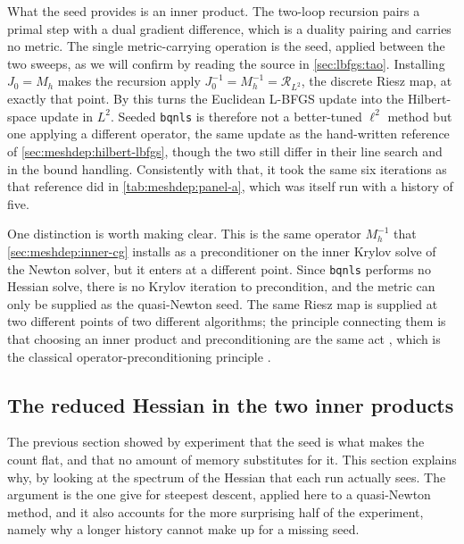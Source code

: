 \documentclass[a4paper,11pt]{article}
\newcommand{\Rmap}{\mathcal{R}}              %
\theoremstyle{spacedplain} \newtheorem{theorem}[counter]{Theorem} \newtheorem{lemma}[counter]{Lemma} \newtheorem{prop}[counter]{Proposition} \newtheorem{cor}[counter]{Corollary}
\theoremstyle{spaceddefinition} \newtheorem{defn}[counter]{Definition} \newtheorem{example}[counter]{Example} \newtheorem{remark}[counter]{Remark}
\begin{document}
What the seed provides is an inner product. The two-loop recursion pairs a primal step with a dual gradient difference, which is a duality pairing and carries no metric. The single metric-carrying operation is the seed, applied between the two sweeps, as we will confirm by reading the source in \cref{sec:lbfgs:tao}. Installing $J_0 = M_h$ makes the recursion apply $J_0^{-1} = M_h^{-1} = \Rmap_{L^{2}}$, the discrete Riesz map, at exactly that point. By \citet[(1.208)--(1.210)]{shfp2017} this turns the Euclidean L-BFGS update into the Hilbert-space update in $L^{2}$. Seeded \texttt{bqnls} is therefore not a better-tuned $\ell^{2}$ method but one applying a different operator, the same update as the hand-written reference of \cref{sec:meshdep:hilbert-lbfgs}, though the two still differ in their line search and in the bound handling. Consistently with that, it took the same six iterations as that reference did in \cref{tab:meshdep:panel-a}, which was itself run with a history of five.

One distinction is worth making clear. This is the same operator $M_h^{-1}$ that \cref{sec:meshdep:inner-cg} installs as a preconditioner on the inner Krylov solve of the Newton solver, but it enters at a different point. Since \texttt{bqnls} performs no Hessian solve, there is no Krylov iteration to precondition, and the metric can only be supplied as the quasi-Newton seed. The same Riesz map is supplied at two different points of two different algorithms; the principle connecting them is that choosing an inner product and preconditioning are the same act \citep[pp.~55--56]{shfp2017}, which is the classical operator-preconditioning principle \citep{kirby2010, mardal2011}.

\subsection{The reduced Hessian in the two inner products}
\label{sec:meshdep:bqnls-why}

The previous section showed by experiment that the seed is what makes the count flat, and that no amount of memory substitutes for it. This section explains why, by looking at the spectrum of the Hessian that each run actually sees. The argument is the one \citet[Sect.~2.2]{shfp2017} give for steepest descent, applied here to a quasi-Newton method, and it also accounts for the more surprising half of the experiment, namely why a longer history cannot make up for a missing seed.
\end{document}
